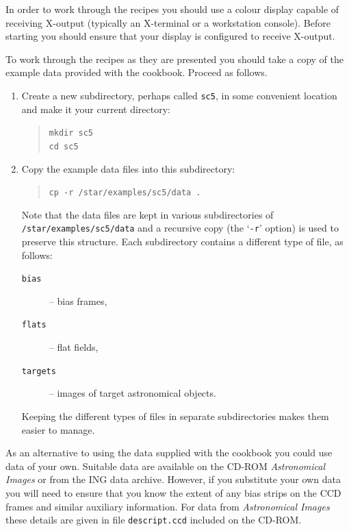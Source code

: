 \documentclass[twoside,11pt]{article}
\newcommand{\htmladdnormallink}[2]{#1}
\begin{document}
In order to work through the recipes you should use a colour display
capable of receiving X-output (typically an X-terminal or a workstation
console).  Before starting you should ensure that your display is configured
to receive X-output.

To work through the recipes as they are presented you should take a
copy of the example data provided with the cookbook.  Proceed as follows.

\begin{enumerate}

  \item Create a new subdirectory, perhaps called {\tt sc5}, in some
   convenient location and make it your current directory:

  \begin{quote}
   {\tt mkdir sc5 \\
   cd sc5}
  \end{quote}

  \item Copy the example data files into this subdirectory:

  \begin{quote}
   {\tt cp -r /star/examples/sc5/data .}
  \end{quote}

   Note that the data files are kept in various subdirectories of
   {\tt /star/examples/sc5/data} and a recursive copy (the `{\tt -r}'
   option) is used to preserve this structure.  Each subdirectory contains
   a different type of file, as follows:

  \begin{description}

    \item[{\tt bias~~~}] -- bias frames,

    \item[{\tt flats~~}] -- flat fields,

    \item[{\tt targets}] -- images of target astronomical objects.

  \end{description}

   Keeping the different types of files in separate subdirectories makes
   them easier to manage.

\end{enumerate}

As an alternative to using the data supplied with the cookbook you could
use data of your own.  Suitable data are available on the CD-ROM {\it
Astronomical Images}\/\cite{JAFFE98} or from the 
\htmladdnormallink{ING data archive}{http://archive.ast.cam.ac.uk/}.
However, if you substitute your own data you will need to ensure that you
know the extent of any bias strips on the CCD frames and similar
auxiliary information.  For data from {\it Astronomical Images}\/ these
details are given in file {\tt descript.ccd} included on the CD-ROM.
\end{document}
